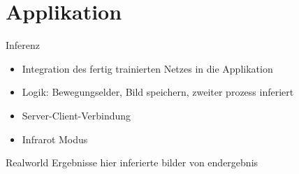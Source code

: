 \section[\thesection \  Applikation]{Applikation}\label{sec:application}

\begin{frame}{Inferenz}

    \begin{itemize}
        \item Integration des fertig trainierten Netzes in die Applikation
        \item Logik: Bewegungselder, Bild speichern, zweiter prozess inferiert
        \item Server-Client-Verbindung
        \item Infrarot Modus        
    \end{itemize}
    
\end{frame}

\begin{frame}{Realworld Ergebnisse}
    hier inferierte bilder von endergebnis

\end{frame}
